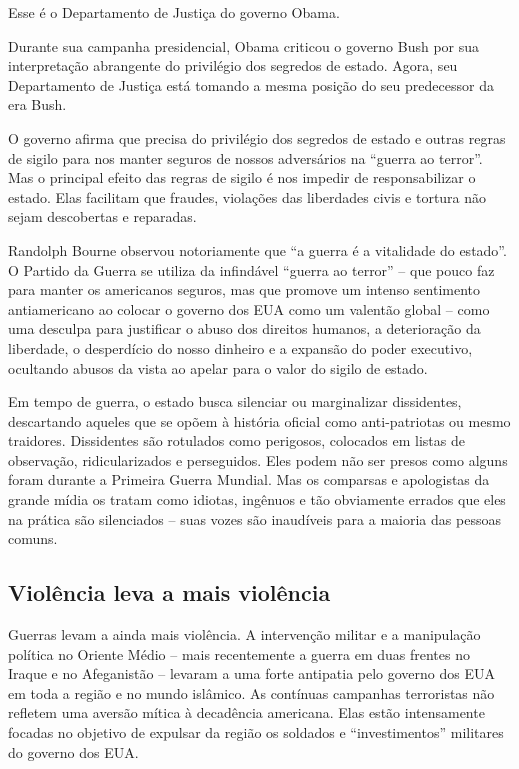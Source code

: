 Esse é o Departamento de Justiça do governo Obama.

Durante sua campanha presidencial, Obama criticou o governo Bush por sua interpretação abrangente do privilégio dos segredos de estado. Agora, seu Departamento de Justiça está tomando a mesma posição do seu predecessor da era Bush.

O governo afirma que precisa do privilégio dos segredos de estado e outras regras de sigilo para nos manter seguros de nossos adversários na ``guerra ao terror''. Mas o principal efeito das regras de sigilo é nos impedir de responsabilizar o estado. Elas facilitam que fraudes, violações das liberdades civis e tortura não sejam descobertas e reparadas.

Randolph Bourne observou notoriamente que ``a guerra é a vitalidade do estado''. O Partido da Guerra se utiliza da infindável ``guerra ao terror'' -- que pouco faz para manter os americanos seguros, mas que promove um intenso sentimento antiamericano ao colocar o governo dos EUA como um valentão global -- como uma desculpa para justificar o abuso dos direitos humanos, a deterioração da liberdade, o desperdício do nosso dinheiro e a expansão do poder executivo, ocultando abusos da vista ao apelar para o valor do sigilo de estado.

Em tempo de guerra, o estado busca silenciar ou marginalizar dissidentes, descartando aqueles que se opõem à história oficial como anti-patriotas ou mesmo traidores. Dissidentes são rotulados como perigosos, colocados em listas de observação, ridicularizados e perseguidos. Eles podem não ser presos como alguns foram durante a Primeira Guerra Mundial. Mas os comparsas e apologistas da grande mídia os tratam como idiotas, ingênuos e tão obviamente errados que eles na prática são silenciados -- suas vozes são inaudíveis para a maioria das pessoas comuns.

\subsection*{Violência leva a mais violência}

Guerras levam a ainda mais violência. A intervenção militar e a manipulação política no Oriente Médio -- mais recentemente a guerra em duas frentes no Iraque e no Afeganistão -- levaram a uma forte antipatia pelo governo dos EUA em toda a região e no mundo islâmico. As contínuas campanhas terroristas não refletem uma aversão mítica à decadência americana. Elas estão intensamente focadas no objetivo de expulsar da região os soldados e ``investimentos'' militares do governo dos EUA.

